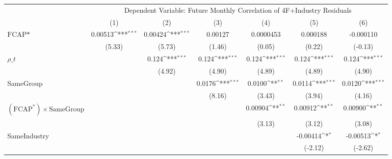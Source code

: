 {
\def\sym#1{\ifmmode^{#1}\else\(^{#1}\)\fi}
\begin{tabular}{l*{6}{c}}
\hline\hline
                    &\multicolumn{6}{c}{Dependent Variable: Future Monthly Correlation of 4F+Industry Residuals}                                        \\\cmidrule(lr){2-7}
                    &\multicolumn{1}{c}{(1)}         &\multicolumn{1}{c}{(2)}         &\multicolumn{1}{c}{(3)}         &\multicolumn{1}{c}{(4)}         &\multicolumn{1}{c}{(5)}         &\multicolumn{1}{c}{(6)}         \\
\hline
$ \text{FCAP*} $    &     0.00513\sym{***}&     0.00424\sym{***}&     0.00127         &   0.0000453         &    0.000188         &   -0.000110         \\
                    &      (5.33)         &      (5.73)         &      (1.46)         &      (0.05)         &      (0.22)         &     (-0.13)         \\
[1em]
 $ {\rho\_t} $       &                     &       0.124\sym{***}&       0.124\sym{***}&       0.124\sym{***}&       0.124\sym{***}&       0.124\sym{***}\\
                    &                     &      (4.92)         &      (4.90)         &      (4.89)         &      (4.89)         &      (4.90)         \\
[1em]
SameGroup           &                     &                     &      0.0176\sym{***}&      0.0100\sym{**} &      0.0114\sym{***}&      0.0120\sym{***}\\
                    &                     &                     &      (8.16)         &      (3.43)         &      (3.94)         &      (4.16)         \\
[1em]
 $ (\text{FCAP}^*) \times {\text{SameGroup} }  $ &                     &                     &                     &     0.00904\sym{**} &     0.00912\sym{**} &     0.00900\sym{**} \\
                    &                     &                     &                     &      (3.13)         &      (3.12)         &      (3.08)         \\
[1em]
SameIndustry        &                     &                     &                     &                     &    -0.00414\sym{*}  &    -0.00513\sym{*}  \\
                    &                     &                     &                     &                     &     (-2.12)         &     (-2.62)         \\

\end{tabular}}
